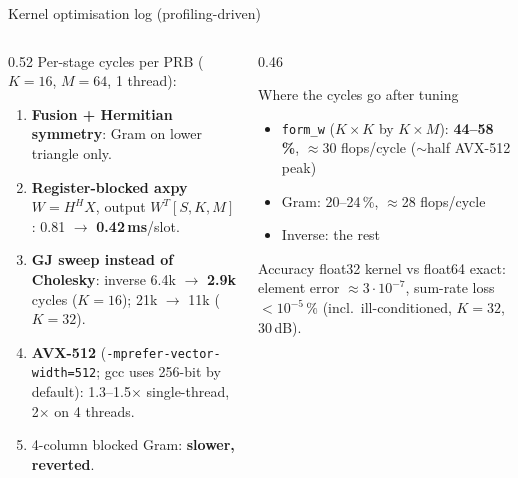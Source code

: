 \documentclass[aspectratio=169,11pt,xcolor=table]{beamer}
\newcommand{\hl}[1]{\textcolor{accent}{\textbf{#1}}}
\begin{document}
\begin{frame}{Kernel optimisation log (profiling-driven)}
  \small
  \begin{columns}[T]
    \begin{column}{0.52\textwidth}
      Per-stage cycles per PRB ($K{=}16$, $M{=}64$, 1 thread):
      \begin{enumerate}
        \item \textbf{Fusion + Hermitian symmetry}: Gram on lower triangle only.
        \item \textbf{Register-blocked axpy} $W = H^H X$, output $W^T[S,K,M]$: 0.81 $\to$ \textbf{0.42\,ms}/slot.
        \item \textbf{GJ sweep instead of Cholesky}: inverse 6.4k $\to$ \textbf{2.9k} cycles ($K{=}16$); 21k $\to$ 11k ($K{=}32$).
        \item \textbf{AVX-512} (\texttt{-mprefer-vector-width=512}; gcc uses 256-bit by default): 1.3--1.5$\times$ single-thread, 2$\times$ on 4 threads.
        \item 4-column blocked Gram: \hl{slower, reverted}.
      \end{enumerate}
    \end{column}
    \begin{column}{0.46\textwidth}
      \begin{block}{Where the cycles go after tuning}
        \begin{itemize}
          \item \texttt{form\_w} ($K\!\times\!K$ by $K\!\times\!M$): \textbf{44--58\,\%}, $\approx$30 flops/cycle ($\sim$half AVX-512 peak)
          \item Gram: 20--24\,\%, $\approx$28 flops/cycle
          \item Inverse: the rest
        \end{itemize}
      \end{block}
      \begin{block}{Accuracy}
        float32 kernel vs float64 exact: element error $\approx 3\cdot10^{-7}$, sum-rate loss $< 10^{-5}\,\%$ (incl.\ ill-conditioned, $K{=}32$, 30\,dB).
      \end{block}
    \end{column}
  \end{columns}
\end{frame}
\end{document}
